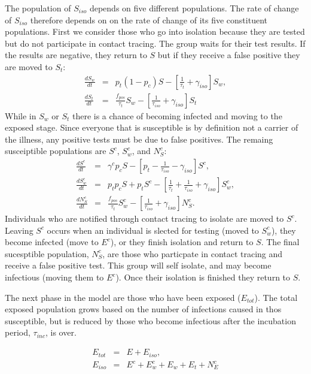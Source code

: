 \documentclass[notitlepage, superscriptaddress]{revtex4-2}
\begin{document}
The population of $S_{iso}$ depends on five different populations. The rate of change of $S_{iso}$ therefore depends on on the rate of change of its five constituent populations. First we consider those who go into isolation because they are tested but do not participate in contact tracing. The group waits for their test results. If the results are negative, they return to $S$ but if they receive a false positive they are moved to $S_{t}$:
\begin{eqnarray}
\label{E:dS_iso}
\frac{dS_{w}}{dt} &=& p_{t} (1 -p_{c}) S - [\frac{1}{\tau_{t}}  + \gamma_{iso}] S_{w}, \\
\frac{dS_{t}}{dt} &=& \frac{f_{pos}}{\tau_{t}} S_{w} - [\frac{1}{\tau_{iso}}  + \gamma_{iso}] S_{t}\end{eqnarray}
While in $S_{w}$ or $S_{t}$ there is a chance of becoming infected and moving to the exposed stage. Since everyone that is susceptible is by definition not a carrier of the illness, any positive tests must be due to false positives. The remaing susceiptible populations are $S^{c}$, $S^{c}_{w}$, and $N^{c}_{S}$:
\begin{eqnarray}
\label{E:dSc}
 \frac{dS^{c}}{dt} &=& \gamma^{c} p_{c} S -[p_{t} -\frac{1}{\tau_{iso}} -\gamma_{iso}] S^{c}, \\
 \frac{dS^{c}_{w}}{dt} &=& p_{t}p_{c} S + p_{t}S^{c} - [\frac{1}{\tau_{t}}  + \frac{1}{\tau_{iso}}  + \gamma_{iso}] S^{c}_{w}, \\ 
 \frac{dN^{c}_{S}}{dt} &=& \frac{f_{pos}}{\tau_{t}} S^{c}_{w} - [\frac{1}{\tau_{iso}}  + \gamma_{iso}] N^{c}_{S}.  
\end{eqnarray}
Individuals who are notified through contact tracing to isolate are moved to $S^{c}$. Leaving $S^{c}$ occurs when an individual is slected for testing (moved to $S^{c}_{w}$), they become infected (move to $E^{c}$), or they finish isolation and return to $S$. The final sucesptible population, $N^{c}_{S}$, are those who particpate in contact tracing and receive a false positive test. This group will self isolate, and may become infectious (moving them to $E^{c}$). Once their isolation is finished they return to $S$.

The next phase in the model are those who have been exposed ($E_{tot}$). The total exposed population grows based on the number of infections caused in thos susceptible, but is reduced by those who become infectious after the incubation period, $\tau_{inc}$, is over.

\begin{eqnarray}
\label{E:Etot}
E_{tot} &=& E + E_{iso}, \\ 
E_{iso} &=& E^{c} + E^{c}_{w} + E_{w} + E_{t} + N^{c}_{E}
\end{eqnarray}
\end{document}
